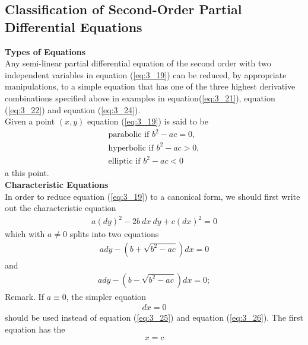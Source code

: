 \documentclass[11pt]{report}
\newcommand{\NI}{\noindent}
\newcommand{\sps}{\\[0.2cm]}
\newcommand{\refn}[1]{(\ref{#1})}
\newcommand{\refx}[1]{\refn{eq:#1}}
\newcommand{\bt}[1]{\textbf{#1}}
\begin{document}
	\subsection{Classification of Second-Order Partial Differential Equations}
	\bt{Types of Equations}\sps
	Any semi-linear partial differential equation of the second order with two independent variables in equation \refx{3_19} can be reduced, by appropriate manipulations, to a simple equation that has one of the three highest derivative combinations specified above in examples in equation\refx{3_21}, equation \refx{3_22} and equation \refx{3_24}.\sps
	Given a point $(x,y)$ equation \refx{3_19} is said to be
	\begin{eqnarray*}
		\text{parabolic if } b^2-ac = 0,\\
		\text{hyperbolic if } b^2-ac > 0,\\
		\text{elliptic if } b^2 - ac < 0
	\end{eqnarray*}
	a this point.\sps
	
	\NI\bt{Characteristic Equations}\\
	In order  to reduce equation \refx{3_19} to a canonical form, we should first write out the characteristic equation
	\begin{eqnarray*}
		a(dy)^2 - 2b~dx~dy + c(dx)^2 = 0
	\end{eqnarray*}
	which with $a\neq 0 $ splits into two equations
	\begin{eqnarray}
		ady - (b+\sqrt{b^2-ac})dx = 0\label{eq:3_25}
	\end{eqnarray}
	and
	\begin{eqnarray}
		ady - (b-\sqrt{b^2-ac})dx = 0;\label{eq:3_26}
	\end{eqnarray}
	Remark. If $a\equiv 0$, the simpler equation
	\begin{eqnarray*}
		dx = 0
	\end{eqnarray*}
	should be used instead of equation \refx{3_25} and equation \refx{3_26}. The first equation has the 
	\begin{eqnarray*}
		x = c
	\end{eqnarray*}
	
\end{document}
